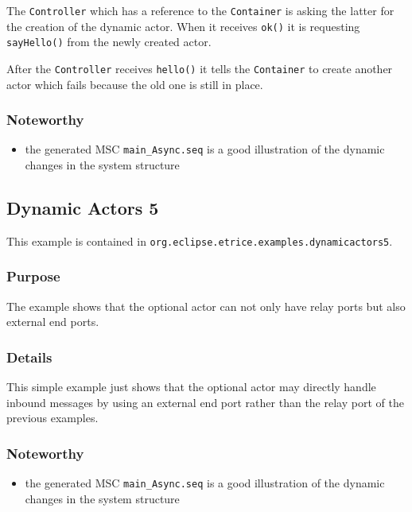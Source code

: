 The \texttt{Controller} which has a reference to the \texttt{Container} is asking the latter
for the creation of the dynamic actor. When it receives \texttt{ok()} it is requesting \texttt{sayHello()}
from the newly created actor.

After the \texttt{Controller} receives \texttt{hello()} it tells the \texttt{Container} to create another
actor which fails because the old one is still in place.

\subsubsection{Noteworthy}

\begin{itemize}
\item the generated MSC \texttt{main\_Async.seq} is a good illustration of the dynamic changes in the system structure
\end{itemize}

\subsection{Dynamic Actors 5}

This example is contained in \texttt{org.eclipse.etrice.examples.dynamicactors5}.

\subsubsection{Purpose}

The example shows that the optional actor can not only have relay ports but also external end ports.

\subsubsection{Details}

This simple example just shows that the optional actor may directly handle inbound messages by using an
external end port rather than the relay port of the previous examples.

\subsubsection{Noteworthy}

\begin{itemize}
\item the generated MSC \texttt{main\_Async.seq} is a good illustration of the dynamic changes in the system structure
\end{itemize}

